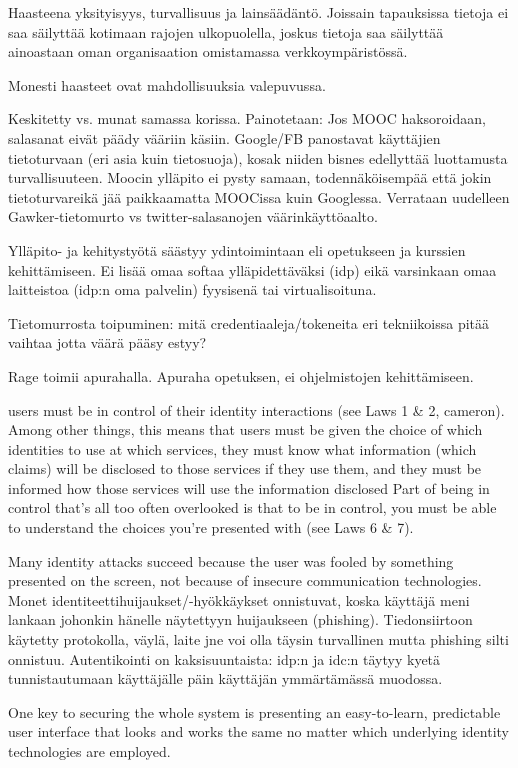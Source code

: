 \documentclass[finnish,gradu]{tktltiki}
\begin{document}
  Haasteena yksityisyys, turvallisuus ja lainsäädäntö. Joissain tapauksissa tietoja ei saa säilyttää kotimaan rajojen ulkopuolella, joskus tietoja saa säilyttää ainoastaan oman organisaation omistamassa verkkoympäristössä.

  Monesti haasteet ovat mahdollisuuksia valepuvussa.

  Keskitetty vs. munat samassa korissa. Painotetaan: Jos MOOC haksoroidaan, salasanat eivät päädy vääriin käsiin. Google/FB panostavat käyttäjien tietoturvaan (eri asia kuin tietosuoja), kosak niiden bisnes edellyttää luottamusta turvallisuuteen. Moocin ylläpito ei pysty samaan, todennäköisempää että jokin tietoturvareikä jää paikkaamatta MOOCissa kuin Googlessa. Verrataan uudelleen Gawker-tietomurto vs twitter-salasanojen väärinkäyttöaalto.

  Ylläpito- ja kehitystyötä säästyy ydintoimintaan eli opetukseen ja kurssien kehittämiseen. Ei lisää omaa softaa ylläpidettäväksi (idp) eikä varsinkaan omaa laitteistoa (idp:n oma palvelin) fyysisenä tai virtualisoituna.

  Tietomurrosta toipuminen: mitä credentiaaleja/tokeneita eri tekniikoissa pitää vaihtaa jotta väärä pääsy estyy?

  Rage toimii apurahalla. Apuraha opetuksen, ei ohjelmistojen kehittämiseen.

  users must be in control of their identity interactions (see Laws 1 \& 2, cameron). Among other things, this means that users must be given the choice of which identities to use at which services, they must know what information (which claims) will be disclosed to those services if they use them, and they must be informed how those services will use the information disclosed
  Part of being in control that’s all too often overlooked is that to be in control, you must be able to understand the choices you’re presented with (see Laws 6 \& 7).

  Many identity attacks succeed because the user was fooled by something presented on the screen, not because of insecure  communication technologies. Monet identiteettihuijaukset/-hyökkäykset onnistuvat, koska käyttäjä meni lankaan johonkin hänelle näytettyyn huijaukseen (phishing). Tiedonsiirtoon käytetty protokolla, väylä, laite jne voi olla täysin turvallinen mutta phishing silti onnistuu. Autentikointi on kaksisuuntaista: idp:n ja idc:n täytyy kyetä tunnistautumaan käyttäjälle päin käyttäjän ymmärtämässä muodossa.

  One key to securing the whole system is presenting an easy-to-learn, predictable user interface that looks and works the same no matter which underlying identity technologies are employed.
\end{document}
